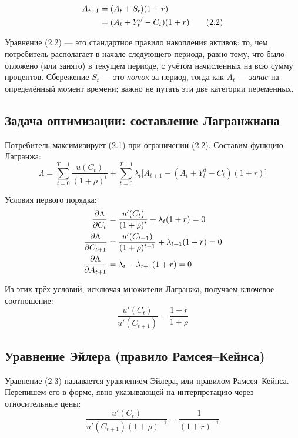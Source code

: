 \documentclass[10pt,a4paper]{article}
\begin{document}
\begin{align}
A_{t+1} &= (A_t + S_t)(1+r) \notag \\
&= (A_t + Y_t^d - C_t)(1+r) \tag{2.2}
\end{align}
 
\begin{intuition}
Уравнение (2.2) — это стандартное правило накопления активов: то, чем потребитель располагает в начале следующего периода, равно тому, что было отложено (или занято) в текущем периоде, с учётом начисленных на всю сумму процентов. Сбережение $S_t$ — это \emph{поток} за период, тогда как $A_t$ — \emph{запас} на определённый момент времени; важно не путать эти две категории переменных.
\end{intuition}
 
\subsection{Задача оптимизации: составление Лагранжиана}
 
Потребитель максимизирует (2.1) при ограничении (2.2). Составим функцию Лагранжа:
\[
\Lambda = \sum_{t=0}^{T-1} \frac{u(C_t)}{(1+\rho)^t} + \sum_{t=0}^{T-1} \lambda_t \Big[A_{t+1} - (A_t + Y_t^d - C_t)(1+r)\Big]
\]
 
Условия первого порядка:
\begin{align}
\frac{\partial \Lambda}{\partial C_t} &= \frac{u'(C_t)}{(1+\rho)^t} + \lambda_t(1+r) = 0 \notag\\
\frac{\partial \Lambda}{\partial C_{t+1}} &= \frac{u'(C_{t+1})}{(1+\rho)^{t+1}} + \lambda_{t+1}(1+r) = 0 \notag\\
\frac{\partial \Lambda}{\partial A_{t+1}} &= \lambda_t - \lambda_{t+1}(1+r) = 0 \notag
\end{align}
 
Из этих трёх условий, исключая множители Лагранжа, получаем ключевое соотношение:
\begin{equation}
\frac{u'(C_t)}{u'(C_{t+1})} = \frac{1+r}{1+\rho} \tag{2.3}
\end{equation}
 
\subsection{Уравнение Эйлера (правило Рамсея--Кейнса)}
 
Уравнение (2.3) называется уравнением Эйлера, или правилом Рамсея--Кейнса. Перепишем его в форме, явно указывающей на интерпретацию через относительные цены:
\[
\frac{u'(C_t)}{u'(C_{t+1})(1+\rho)^{-1}} = \frac{1}{(1+r)^{-1}}
\]
 
\end{document}
